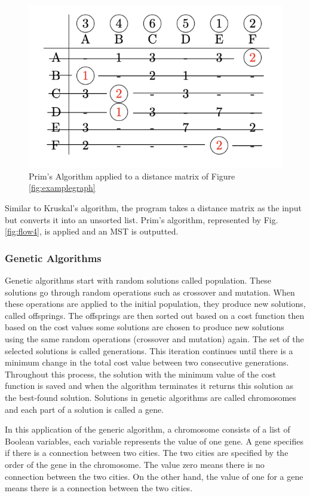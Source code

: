 \documentclass[twocolumn]{article}
\begin{document}
\begin{figure}[H]
\centering
\includegraphics[width=0.75\columnwidth]{Figures/Prims Table Example.png}
\caption{Prim’s Algorithm applied to a distance matrix of Figure \ref{fig:examplegraph}}
\end{figure}


Similar to Kruskal’s algorithm, the program takes a distance matrix as the input but converts it into an unsorted list. Prim’s algorithm, represented by Fig. \ref{fig:flow4}, is applied and an MST is outputted.


\subsubsection{Genetic Algorithms}
Genetic algorithms start with random solutions called population. These solutions go through random operations such as crossover and mutation. When these operations are applied to the initial population, they produce new solutions, called offsprings.
The offsprings are then sorted out based on a cost function then based on the cost values some solutions are chosen to produce new solutions using the same random operations (crossover and mutation) again. The set of the selected solutions is called generations.
This iteration continues until there is a minimum change in the total cost value between two consecutive generations.
Throughout this process, the solution with the minimum value of the cost function is saved and when the algorithm terminates it returns this solution as the best-found solution.
Solutions in genetic algorithms are called chromosomes and each part of a solution is called a gene.\par

\par In this application of the generic algorithm, a chromosome consists of a list of Boolean variables, each variable represents the value of one gene. A gene specifies if there is a connection between two cities. The two cities are specified by the order of the gene in the chromosome. The value zero means there is no connection between the two cities. On the other hand, the value of one for a gene means there is a connection between the two cities.\par
\end{document}
